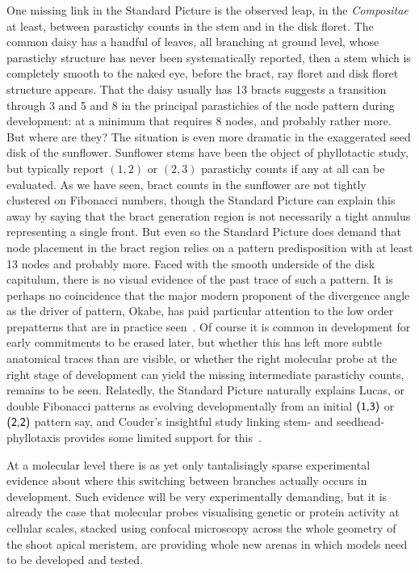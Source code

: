 One missing link in the Standard Picture is the observed leap, in the \textit{Compositae} at least, between parastichy counts in the stem and in the disk floret. The common daisy has a handful of leaves, all branching at ground level, whose parastichy structure has never been systematically reported, then a stem which is completely smooth to the naked eye, before the bract, ray floret and disk floret structure appears. That the daisy usually has 13 bracts suggests a transition through 3 and 5 and 8 in the principal parastichies of the node pattern during development: at a minimum that requires 8 nodes, and probably rather more. But where are they? The situation is even more dramatic in the exaggerated seed disk of the sunflower. Sunflower stems have been the object of phyllotactic study, but typically report $(1,2)$ or $(2,3)$ parastichy counts if any at all can be evaluated. As we have seen, bract counts in the sunflower are not tightly clustered on Fibonacci numbers, though the Standard Picture can explain this away by saying that the bract generation region is not necessarily a tight annulus representing a single front. But even so the Standard Picture does demand that node placement in the bract region relies on a pattern predisposition with at least 13 nodes and probably more. Faced with the smooth underside of the disk capitulum, there is no visual evidence of the past trace of such a pattern. It is perhaps no coincidence that the major modern  proponent of the divergence angle as the driver of pattern, Okabe, has paid particular attention to the low order prepatterns that are in practice seen~\autocite{okabeBiophysicalOptimalityGolden2015}. Of course it is common in development for early commitments to be erased later, but whether this has left more subtle anatomical traces than are visible, or whether the right molecular probe at the right stage of development can yield the missing intermediate parastichy counts, remains to be seen. 
  Relatedly, the Standard Picture naturally explains Lucas, or double Fibonacci patterns as evolving developmentally from an initial $\textsf{(1,3)}$ or $\textsf{(2,2)}$ pattern say,
  and  Couder's insightful study linking stem- and seedhead-phyllotaxis provides some limited support for this~\cite{couderInitialTransitionsOrder1998}. 
  
   At a molecular level there is as yet only tantalisingly sparse experimental evidence about where this switching between branches actually occurs in development. Such evidence will be very experimentally demanding, but it is already the case that molecular probes visualising genetic or protein activity at cellular scales, stacked using confocal microscopy across the whole geometry of the shoot apical meristem, are providing whole new arenas in which models need to be developed and tested. 
  
